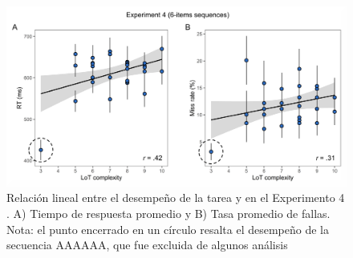 \begin{figure}[t!]
      \includegraphics[scale=0.8]{figuras/plosbio/journal.pcbi.1008598.s006.png}
      \centering
      \caption{Relación lineal entre el desempeño de la tarea y \mdlbin en el Experimento 4 . A) Tiempo de respuesta promedio y B) Tasa promedio de fallas. Nota: el punto encerrado en un círculo resalta el desempeño de la secuencia AAAAAA, que fue excluida de algunos análisis}
      \label{PlosBIO-S6}
\end{figure}

